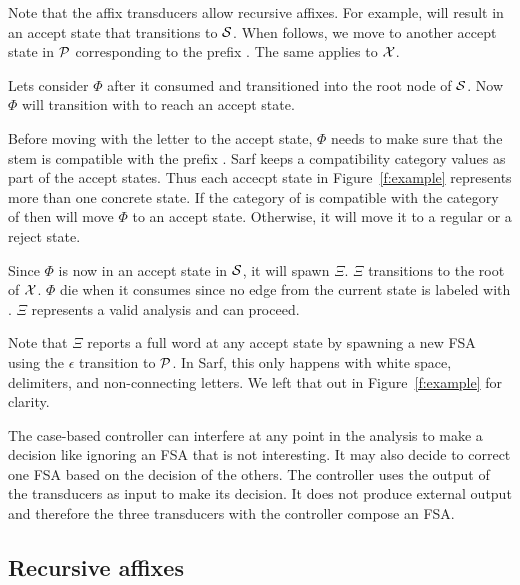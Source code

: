 \documentclass[11pt]{article}
\begin{document}
Note that the affix transducers allow recursive 
affixes. 
For example,  will result in an accept state
that transitions to ${\cal S}$.
When  follows, we move to another accept state in 
${\cal P}$ corresponding to the prefix . 
The same applies to ${\cal X}$. 

Lets consider $\Phi$ after it consumed  
and transitioned into the root node of ${\cal S}$.
Now $\Phi$ will transition with  to reach an accept 
state. 

Before moving with the letter  to the accept state,
$\Phi$ needs to make sure that the stem  is compatible
with the prefix . 
Sarf keeps a compatibility category values as part
of the accept states. 
Thus each accecpt state in Figure~\ref{f:example} represents
more than one concrete state. 
If the category of  is compatible with the category of
 then  will move $\Phi$ to an accept state. 
Otherwise, it will move it to a regular or a reject state. 
       
Since $\Phi$ is now in an accept state in ${\cal S}$, it will
spawn $\Xi$. $\Xi$ transitions to the root of ${\cal X}$. 
$\Phi$ die when it consumes  since
no edge from the current state is labeled with . 
$\Xi$ represents a valid analysis and can proceed.
       
Note that $\Xi$ reports a full word at any accept state
by spawning a new FSA using the $\epsilon$ transition
to ${\cal P}$.
In Sarf, this only happens with white space, delimiters, 
and non-connecting letters. 
We left that out in Figure~\ref{f:example} for clarity. 
       
The case-based controller can interfere at any point in the 
analysis to make a decision like ignoring an FSA that 
is not interesting. 
It may also decide to correct one FSA
based on the decision of the others. 
The controller uses the output of the transducers as input
to make its decision. 
It does not produce external output and therefore 
the three transducers with the 
controller compose an FSA.

\subsection{Recursive affixes}
\label{sec:recaffix}
\end{document}
